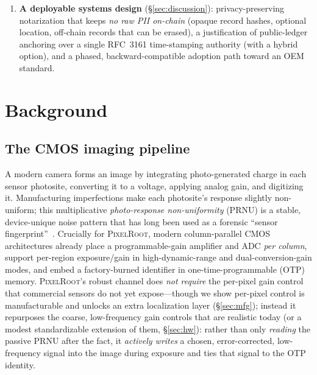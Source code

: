 \documentclass[journal]{IEEEtran}
\newcommand{\pr}{\textup{\textsc{PixelRoot}}}
\begin{document}
\begin{enumerate}
\S\ref{sec:eval}) of the in-pixel channel on the $24$ Kodak photographs
with \emph{real libjpeg/WebP} codecs, a \emph{real Reed--Solomon} code, and a
WAVES-style attack suite (JPEG, WebP, noise, blur, resize, photometric, crop)---%
reporting real PSNR/SSIM, BER--quality curves, an amplitude operating curve,
wrong-key/forgery/copy-attack false-accept rates, a real-splice
tamper-localization measurement (ROC-AUC/F1/IoU), and a passive-PRNU baseline,
together with an explicit account of the geometric limits.
\item \textbf{A deployable systems design} (\S\ref{sec:discussion}):
privacy-preserving notarization that keeps \emph{no raw PII on-chain}
(opaque record hashes, optional location, off-chain records that can be
erased), a justification of public-ledger anchoring over a
single RFC~3161 time-stamping authority (with a hybrid option), and a phased,
backward-compatible adoption path toward an OEM standard.
\end{enumerate}
\fi


\ifshort
\else
\section{Background}\label{sec:background}

\subsection{The CMOS imaging pipeline}
A modern camera forms an image by integrating photo-generated charge in each
sensor photosite, converting it to a voltage, applying analog gain, and
digitizing it. Manufacturing imperfections make each photosite's response
slightly non-uniform; this multiplicative \emph{photo-response non-uniformity}
(PRNU) is a stable, device-unique noise pattern that has long been used as a
forensic ``sensor fingerprint''~\cite{lukas2006digital,chen2008determining}.
Crucially for \pr{}, modern column-parallel CMOS architectures already place a
programmable-gain amplifier and ADC \emph{per column}, support per-region
exposure/gain in high-dynamic-range and dual-conversion-gain modes, and embed a
factory-burned identifier in one-time-programmable (OTP) memory. \pr{}'s robust
channel does \emph{not require} the per-pixel gain control that commercial
sensors do not yet expose---though we show per-pixel control is manufacturable
and unlocks an extra localization layer (\S\ref{sec:mfg}); instead it repurposes
the coarse, low-frequency gain controls that are realistic today (or a modest
standardizable extension of them, \S\ref{sec:hw}):
rather than only \emph{reading} the passive PRNU after the fact, it
\emph{actively writes} a chosen, error-corrected, low-frequency signal into the
image during exposure and ties that signal to the OTP identity.
\end{document}
